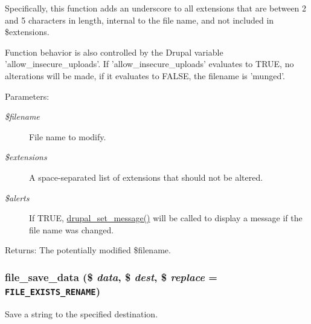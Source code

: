 Specifically, this function adds an underscore to all extensions that are between 2 and 5 characters in length, internal to the file name, and not included in \$extensions.

Function behavior is also controlled by the Drupal variable 'allow\_\-insecure\_\-uploads'. If 'allow\_\-insecure\_\-uploads' evaluates to TRUE, no alterations will be made, if it evaluates to FALSE, the filename is 'munged'.

\begin{Desc}
\item[Parameters:]
\begin{description}
\item[{\em \$filename}]File name to modify. \item[{\em \$extensions}]A space-separated list of extensions that should not be altered. \item[{\em \$alerts}]If TRUE, \hyperlink{bootstrap_8inc_d9223d86c7b08b1288274ce211d9bfa6}{drupal\_\-set\_\-message()} will be called to display a message if the file name was changed.\end{description}
\end{Desc}
\begin{Desc}
\item[Returns:]The potentially modified \$filename. \end{Desc}
\hypertarget{group__file_g0c3dd2f6c8734744740fd1f00f84c719}{
\subsubsection[{file\_\-save\_\-data}]{\setlength{\rightskip}{0pt plus 5cm}file\_\-save\_\-data (\$ {\em data}, \/  \$ {\em dest}, \/  \$ {\em replace} = {\tt FILE\_\-EXISTS\_\-RENAME})}}
\label{group__file_g0c3dd2f6c8734744740fd1f00f84c719}


Save a string to the specified destination.

